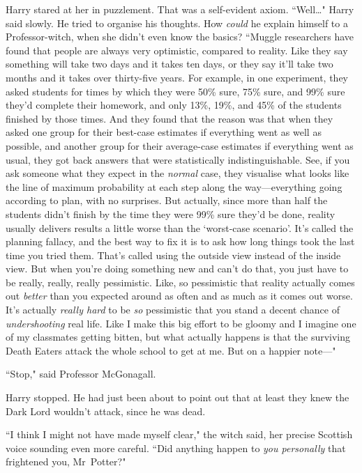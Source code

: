 Harry stared at her in puzzlement. That was a self-evident axiom. ``Well{\ldots}" Harry said slowly. He tried to organise his thoughts. How \emph{could} he explain himself to a Professor-witch, when she didn't even know the basics? ``Muggle researchers have found that people are always very optimistic, compared to reality. Like they say something will take two days and it takes ten days, or they say it'll take two months and it takes over thirty-five years. For example, in one experiment, they asked students for times by which they were 50\% sure, 75\% sure, and 99\% sure they'd complete their homework, and only 13\%, 19\%, and 45\% of the students finished by those times. And they found that the reason was that when they asked one group for their best-case estimates if everything went as well as possible, and another group for their average-case estimates if everything went as usual, they got back answers that were statistically indistinguishable. See, if you ask someone what they expect in the \emph{normal} case, they visualise what looks like the line of maximum probability at each step along the way—everything going according to plan, with no surprises. But actually, since more than half the students didn't finish by the time they were 99\% sure they'd be done, reality usually delivers results a little worse than the `worst-case scenario'. It's called the planning fallacy, and the best way to fix it is to ask how long things took the last time you tried them. That's called using the outside view instead of the inside view. But when you're doing something new and can't do that, you just have to be really, really, really pessimistic. Like, so pessimistic that reality actually comes out \emph{better} than you expected around as often and as much as it comes out worse. It's actually \emph{really hard} to be \emph{so} pessimistic that you stand a decent chance of \emph{undershooting} real life. Like I make this big effort to be gloomy and I imagine one of my classmates getting bitten, but what actually happens is that the surviving Death Eaters attack the whole school to get at me. But on a happier note—"

``Stop," said Professor McGonagall.

Harry stopped. He had just been about to point out that at least they knew the Dark Lord wouldn't attack, since he was dead.

``I think I might not have made myself clear," the witch said, her precise Scottish voice sounding even more careful. ``Did anything happen to \emph{you personally} that frightened you, Mr~Potter?"

